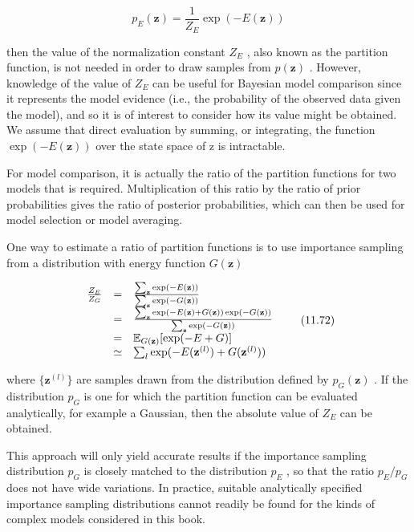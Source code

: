\documentclass[
  10
]{article}
\begin{document}
\[
p _ {E} (\mathbf {z}) = \frac {1}{Z _ {E}} \exp (- E (\mathbf {z}))\tag{11.71}
\]

then the value of the normalization constant \(Z _ { E }\) , also known
as the partition function, is not needed in order to draw samples from
\(p ( \mathbf { z } )\) . However, knowledge of the value of
\(Z _ { E }\) can be useful for Bayesian model comparison since it
represents the model evidence (i.e., the probability of the observed
data given the model), and so it is of interest to consider how its
value might be obtained. We assume that direct evaluation by summing, or
integrating, the function \(\exp ( - E ( \mathbf { z } ) )\) over the
state space of z is intractable.

For model comparison, it is actually the ratio of the partition
functions for two models that is required. Multiplication of this ratio
by the ratio of prior probabilities gives the ratio of posterior
probabilities, which can then be used for model selection or model
averaging.

One way to estimate a ratio of partition functions is to use importance
sampling from a distribution with energy function
\(G ( \mathbf { z } )\)

\[
\begin{array}{r c l} \frac {Z _ {E}}{Z _ {G}} & = & \frac {\sum_ {\mathbf {z}} \exp (- E (\mathbf {z}))}{\sum_ {\mathbf {z}} \exp (- G (\mathbf {z}))} \\ & = & \frac {\sum_ {\mathbf {z}} \exp (- E (\mathbf {z}) + G (\mathbf {z})) \exp (- G (\mathbf {z}))}{\sum_ {\mathbf {z}} \exp (- G (\mathbf {z}))} \\ & = & \mathbb {E} _ {G (\mathbf {z})} [ \exp (- E + G) ] \\ & \simeq & \sum_ {l} \exp (- E (\mathbf {z} ^ {(l)}) + G (\mathbf {z} ^ {(l)})) \end{array}\tag{11.72}
\]

where \(\{ \mathbf { z } ^ { ( l ) } \}\) are samples drawn from the
distribution defined by \(p _ { G } ( \mathbf { z } )\) . If the
distribution \(p _ { G }\) is one for which the partition function can
be evaluated analytically, for example a Gaussian, then the absolute
value of \(Z _ { E }\) can be obtained.

This approach will only yield accurate results if the importance
sampling distribution \(p _ { G }\) is closely matched to the
distribution \(p _ { E }\) , so that the ratio \(p _ { E } / p _ { G }\)
does not have wide variations. In practice, suitable analytically
specified importance sampling distributions cannot readily be found for
the kinds of complex models considered in this book.
\end{document}
